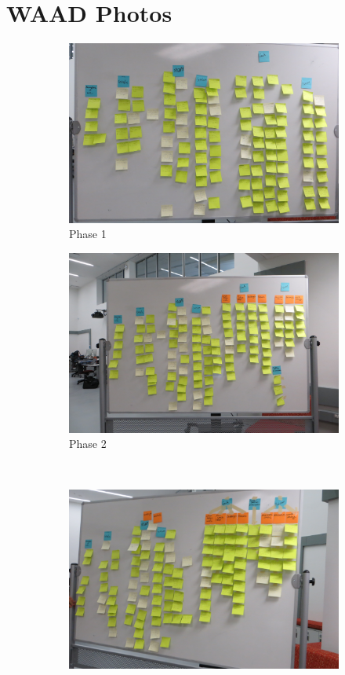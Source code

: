 \documentclass[12pt]{article} %
\begin{document}
\section{WAAD Photos} %
  \begin{figure}[H]
  \begin{subfigure}{.5\linewidth}
  \centering
  \includegraphics[width=0.95\linewidth]{WAAD_version1}
  \caption{Phase 1}
  \label{fig:WAAD_version1}
  \end{subfigure}%
  \begin{subfigure}{.5\linewidth}
  \centering
  \includegraphics[width=0.95\linewidth]{WAAD_version2}
  \caption{Phase 2}
  \label{fig:WAAD_version2}
  \end{subfigure}\\[1ex]
  \begin{subfigure}{.5\linewidth}
  \centering
  \includegraphics[width=0.95\linewidth]{WAAD_version3}

\end{subfigure}
\end{figure}
\end{document}
